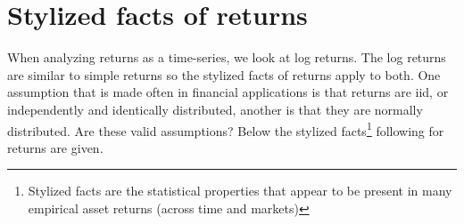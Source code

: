 \documentclass[a4paper, twoside]{templates/ociamthesis}
\begin{document}
\minitoc 

\hypertarget{styl-facts}{%
\section{Stylized facts of returns}\label{styl-facts}}

\noindent When analyzing returns as a time-series, we look at log returns. The log returns are similar to simple returns so the stylized facts of returns apply to both. One assumption that is made often in financial applications is that returns are iid, or independently and identically distributed, another is that they are normally distributed. Are these valid assumptions? Below the stylized facts\footnote{Stylized facts are the statistical properties that appear to be present in many empirical asset returns (across time and markets)} following \textcite{annaert2021} for returns are given.
\end{document}
